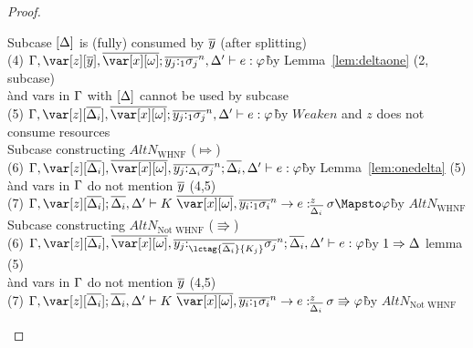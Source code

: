 \begin{proof}
\begin{description}
\begin{tabbing}
    Subcase $\left[\Delta\right]$ is (fully) consumed by $\overline{y}$ (after splitting)\\
    (4) $\G,\z[\ov{y}],\ov{\xo};\ov{y_j{:}_{1}\s_j}^n, \D' \vdash e : \vp$\`by Lemma~\ref{lem:deltaone} (2, subcase)\\\` and vars in $\Gamma$ with $\left[\Delta\right]$ cannot be used by subcase\\
    (5) $\G,\z[\ov{\D_i}],\ov{\xo};\ov{y_j{:}_{1}\s_j}^n, \D' \vdash e : \vp$\`by $Weaken$ and $z$ does not consume resources\\
    Subcase constructing $AltN_{\textrm{WHNF}}$ ($\Mapsto$)\\
    (6) $\G,\z[\ov{\D_i}],\ov{\xo},\ov{y_j{:}_{\D_i}\s_j}^n; \ov{\D_i}, \D' \vdash e : \vp$\`by Lemma~\ref{lem:onedelta} (5)\\\`and vars in $\Gamma$ do not mention $\overline{y}$ (4,5)\\
    (7) $\G,\z[\ov{\D_i}]; \ov{\D_i}, \D' \vdash K~\ov{\xo},\ov{y_i{:}_{1}\s_i}^n\to e :^z_{\ov{\D_i}} \s \Mapsto \vp$\`by $AltN_{\textrm{WHNF}}$\\
    Subcase constructing $AltN_{\textrm{Not WHNF}}$ ($\Rrightarrow$)\\
    (6) $\G,\z[\ov{\D_i}],\ov{\xo},\ov{y_j{:}_{\lctag{\ov{\D_i}}{K_j}}\s_j}^n; \ov{\D_i}, \D' \vdash e : \vp$\`by $1 \Rightarrow \Delta$ lemma (5)\\\`and vars in $\Gamma$ do not mention $\overline{y}$ (4,5)\\
    (7) $\G,\z[\ov{\D_i}]; \ov{\D_i}, \D' \vdash K~\ov{\xo},\ov{y_i{:}_{1}\s_i}^n\to e :^z_{\ov{\D_i}} \s \Rrightarrow \vp$\`by $AltN_{\textrm{Not WHNF}}$\\
\end{tabbing}

\end{description}
\end{proof}

